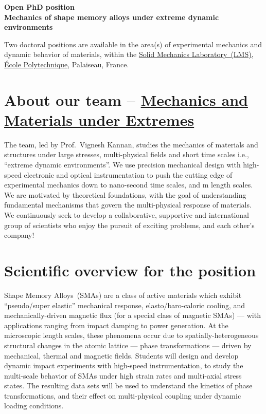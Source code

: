 \documentclass[a4paper,11pt,fleqn]{article}
\begin{document}
	\setlength{\abovedisplayskip}{2 pt}
	\setlength{\belowdisplayskip}{2 pt}
	\sffamily
	\thispagestyle{titlepage}
	\begin{center}
		\vspace*{-2.5em}
		\Large \textbf{Open PhD position \\ Mechanics of shape memory alloys under extreme dynamic environments} 
	\end{center}
	
	Two doctoral positions are available in the area(s) of experimental mechanics and dynamic behavior of materials, within the \href{https://portail.polytechnique.edu/lms/en}{Solid Mechanics Laboratory~(LMS)}, \href{https://www.polytechnique.edu/en}{{\'E}cole Polytechnique}, Palaiseau, France. 
	
	\section*{About our team -- \href{https://vigneshkannan-group.github.io/vk-mxm-website/}{Mechanics and Materials under Extremes}}
	The team, led by Prof.~Vignesh Kannan, studies the mechanics of materials and structures under large stresses, multi-physical fields and short time scales i.e., ``extreme dynamic environments''. We use precision mechanical design with high-speed electronic and optical instrumentation to push the cutting edge of experimental mechanics down to nano-second time scales, and \textmu m length scales. We are motivated by theoretical foundations, with the goal of understanding fundamental mechanisms that govern the multi-physical response of materials. We continuously seek to develop a collaborative, supportive and international group of scientists who enjoy the pursuit of exciting problems, and each other's company!

	\section*{Scientific overview for the position}
	Shape Memory Alloys~(SMAs) are a class of active materials which exhibit ``pseudo/super elastic'' mechanical response, elasto/baro-caloric cooling, and mechanically-driven magnetic flux (for a special class of magnetic SMAs) --- with applications ranging from impact damping to power generation. At the microscopic length scales, these phenomena occur due to spatially-heterogeneous structural changes in the atomic lattice --- phase transformations --- driven by mechanical, thermal and magnetic fields. Students will design and develop dynamic impact experiments with high-speed instrumentation, to study the multi-scale behavior of SMAs under high strain rates and multi-axial stress states. The resulting data sets will be used to understand the kinetics of phase transformations, and their effect on multi-physical coupling under dynamic loading conditions. 
	
\end{document}

